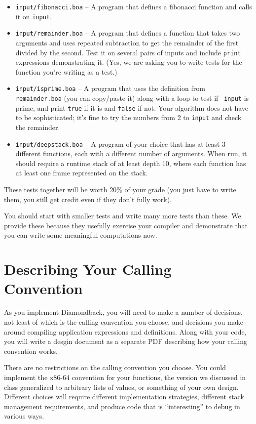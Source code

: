 \documentclass[10pt, oneside]{article}
\begin{document}
\begin{itemize}
\item {\tt input/fibonacci.boa} -- A program that defines a fibonacci
function and calls it on {\tt input}.
\item {\tt input/remainder.boa} -- A program that defines a function that
takes two arguments and uses repeated subtraction to get the remainder of the
first divided by the second. Test it on several pairs of inputs and include
{\tt print} expressions demonstrating it. (Yes, we are asking you to write
tests for the function you're writing as a test.)
\item {\tt input/isprime.boa} -- A program that uses the definition from
{\tt remainder.boa} (you can copy/paste it) along with a loop to test if {\tt
input} is prime, and print {\tt true} if it is and {\tt false} if not. Your
algorithm does not have to be sophisticated; it's fine to try the
numbers from 2 to {\tt input} and check the remainder.
\item {\tt input/deepstack.boa} -- A program of your choice that has at least
3 different functions, each with a different number of arguments. When run,
it should require a runtime stack of at least depth 10, where each function
has at least one frame represented on the stack.
\end{itemize}

These tests together will be worth 20\% of your grade (you just have to write
them, you still get credit even if they don't fully work).

You should start with smaller tests and write many more tests than these. We
provide these because they usefully exercise your compiler and demonstrate
that you can write some meaningful computations now.


\section*{Describing Your Calling Convention}

As you implement Diamondback, you will need to make a number of decisions,
not least of which is the calling convention you choose, and decisions you
make around compiling application expressions and definitions. Along with
your code, you will write a desgin document as a separate PDF describing how
your calling convention works. 

There are no restrictions on the calling convention you choose. You could
implement the x86-64 convention for your functions, the version we discussed
in class generalized to arbitrary lists of values, or something of your own
design. Different choices will require different implementation strategies,
different stack management requirements, and produce code that is
``interesting'' to debug in various ways.
\end{document}
